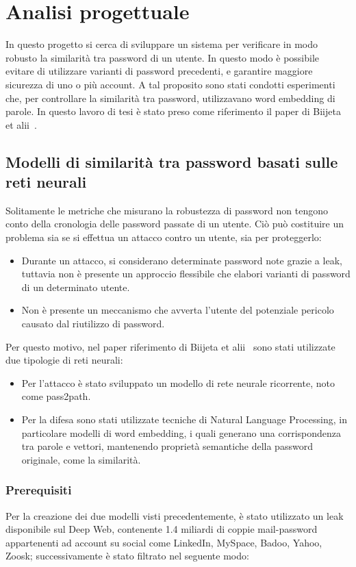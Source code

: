 \chapter{Analisi progettuale}
\label{ch:analisi progettuale}

In questo progetto si cerca di sviluppare un sistema per verificare in modo robusto la similarità tra password di un utente. In questo modo è possibile evitare di utilizzare varianti di password precedenti, e garantire maggiore sicurezza di uno o più account.
A tal proposito sono stati condotti esperimenti che, per controllare la similarità tra password, utilizzavano word embedding di parole. In questo lavoro di tesi è stato preso come riferimento il paper di Biijeta  et alii~\cite{biijeta}.

\section{Modelli di similarità tra password basati sulle reti neurali}

Solitamente le metriche che misurano la robustezza di password non tengono conto della cronologia delle password passate di un utente. 
Ciò può costituire un problema sia se si effettua un attacco contro un utente, sia per proteggerlo:
\begin{itemize}
    \item Durante un attacco, si considerano determinate password note grazie a leak, tuttavia non è presente un approccio flessibile che elabori varianti di password di un determinato utente.
    \item Non è presente un meccanismo che avverta l'utente del potenziale pericolo causato dal riutilizzo di password.
\end{itemize}
Per questo motivo, nel paper riferimento di Biijeta et alii~\cite{biijeta} sono stati utilizzate due tipologie di reti neurali:
\begin{itemize}
    \item Per l'attacco è stato sviluppato un modello di rete neurale ricorrente, noto come pass2path.
    \item Per la difesa sono stati utilizzate tecniche di Natural Language Processing, in particolare modelli di word embedding, i quali generano una corrispondenza tra parole e vettori, mantenendo proprietà semantiche della password originale, come la similarità.
\end{itemize}

\subsection{Prerequisiti}
Per la creazione dei due modelli visti precedentemente, è stato utilizzato un leak disponibile sul Deep Web, contenente 1.4 miliardi di coppie mail-password appartenenti ad account su social come LinkedIn, MySpace, Badoo, Yahoo, Zoosk; successivamente è stato filtrato nel seguente modo:

